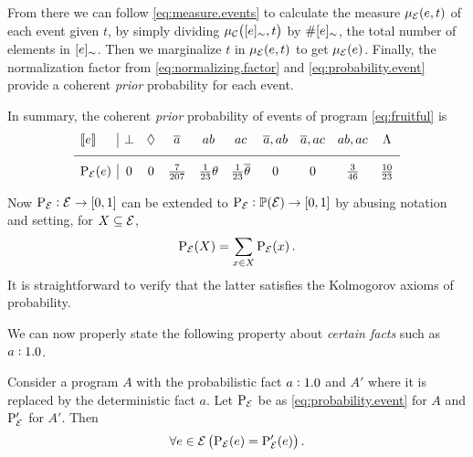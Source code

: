 \documentclass[x11names]{tlp}
\begin{document}
\begin{example}
		From there we can follow \cref{eq:measure.events} to calculate the measure
		$\pwe{e, t}$ of each event given $t$, by simply dividing $\pwc{\class{e}, t}$
		by $\#[{e}]_{\sim}$, the total number of elements in $[{e}]_{\sim}$. Then we
		marginalize $t$ in $\pwe{e, t}$ to get $\pwe{e}$. Finally, the normalization
		factor from \cref{eq:normalizing.factor} and \cref{eq:probability.event}
		provide a coherent \emph{prior} probability for each event.

		In summary, the coherent \emph{prior} probability of events of program
		\cref{eq:fruitful} is
		\begin{equation}
			\begin{array}{l|ccccccccc}
				\stablecore{e}          &
				\inconsistent           &
				\indepclass             &
				\co{a}                  &
				ab                      &
				ac                      &
				\co{a}, ab              &
				\co{a}, ac              &
				ab, ac                  &
				\consequenceclass
				\\ \hline
				\prE\at{e}              &
				0                       &
				0                       &
				\frac{7}{207}           &
				\frac{1}{23}\theta      &
				\frac{1}{23}\co{\theta} &
				0                       &
				0                       &
				\frac{3}{46}            &
				\frac{10}{23}
			\end{array}
		\end{equation}
		\label{eq:sbf.prior}

	\end{example}
\fi

Now $\prE:\EVENTSset \to \intcc{0,1}$ can be extended to
$\prE:\powerset{\EVENTSset}\to\intcc{0,1}$ by abusing notation and setting,
for $X \subseteq \EVENTSset$,
\begin{equation}
	\prE\at{X} = \sum_{x\in X}\prE\at{x}.
	\label{eq:prob.event.set}
\end{equation}
It is straightforward to verify that the latter satisfies the Kolmogorov
axioms of probability.

We can now properly state the following property about \emph{certain facts}
such as $a:1.0$.
\begin{proposition}
	\label{prop:prob.one}

	Consider a program $A$ with the probabilistic fact $a:1.0$ and
	$A'$ where it is replaced by the deterministic fact $a$. Let $\prE$ be as
	\cref{eq:probability.event} for $A$ and $\prfunc'_{\EVENTSset}$ for $A'$.
	Then
	\begin{equation}
		\forall e \in \EVENTSset \left(\prE\at{e} = \prfunc'_{\EVENTSset}\at{e}\right).
	\end{equation}
\end{proposition}
\end{document}
